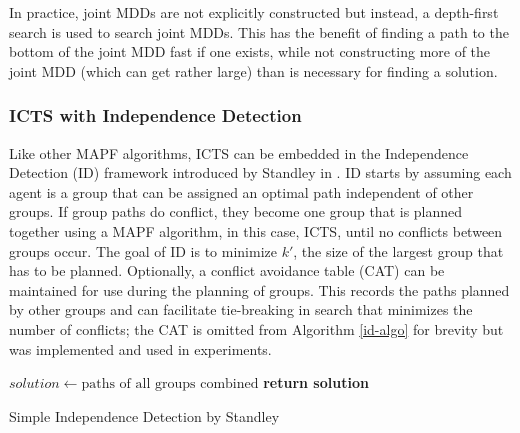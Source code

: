 \documentclass[english,10pt]{article}
\begin{document}
	In practice, joint MDDs are not explicitly constructed but instead, a depth-first search is used to search joint MDDs. This has the benefit of finding a path to the bottom of the joint MDD fast if one exists, while not constructing more of the joint MDD (which can get rather large) than is necessary for finding a solution.
	\subsubsection{ICTS with Independence Detection}
	Like other MAPF algorithms, ICTS can be embedded in the Independence Detection (ID) framework introduced by Standley in \cite{standley2010}. ID starts by assuming each agent is a group that can be assigned an optimal path independent of other groups. If group paths do conflict, they become one group that is planned together using a MAPF algorithm, in this case, ICTS, until no conflicts between groups occur. The goal of ID is to minimize $k'$, the size of the largest group that has to be planned. Optionally, a conflict avoidance table (CAT) can be maintained for use during the planning of groups. This records the paths planned by other groups and can facilitate tie-breaking in search that minimizes the number of conflicts; the CAT is omitted from Algorithm \ref{id-algo} for brevity but was implemented and used in experiments.
	\begin{algorithm}
		\begin{algorithmic}[1]
			\State {}
			\State {}
			\Repeat
			\State {}
			\State {}
			\State {}
			\State $solution\gets\text{paths of all groups combined}$
			\State \textbf{return solution}
		\end{algorithmic}
		\caption{Simple Independence Detection by Standley} 
		\label{id-algo}
	\end{algorithm}
\end{document}
